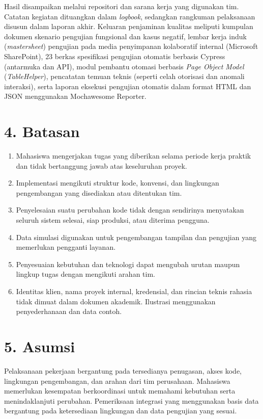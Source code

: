 Hasil disampaikan melalui repositori dan sarana kerja yang digunakan tim. Catatan kegiatan dituangkan dalam \textit{logbook}, sedangkan rangkuman pelaksanaan disusun dalam laporan akhir. Keluaran penjaminan kualitas meliputi kumpulan dokumen skenario pengujian fungsional dan kasus negatif, lembar kerja induk (\textit{mastersheet}) pengujian pada media penyimpanan kolaboratif internal (Microsoft SharePoint), 23 berkas spesifikasi pengujian otomatis berbasis Cypress (antarmuka dan API), modul pembantu otomasi berbasis \textit{Page Object Model} (\textit{TableHelper}), pencatatan temuan teknis (seperti celah otorisasi dan anomali interaksi), serta laporan eksekusi pengujian otomatis dalam format HTML dan JSON menggunakan Mochawesome Reporter.

\section*{4. Batasan}
\begin{enumerate}[label=\alph*)]
\item Mahasiswa mengerjakan tugas yang diberikan selama periode kerja praktik dan tidak bertanggung jawab atas keseluruhan proyek.
\item Implementasi mengikuti struktur kode, konvensi, dan lingkungan pengembangan yang disediakan atau ditentukan tim.
\item Penyelesaian suatu perubahan kode tidak dengan sendirinya menyatakan seluruh sistem selesai, siap produksi, atau diterima pengguna.
\item Data simulasi digunakan untuk pengembangan tampilan dan pengujian yang memerlukan pengganti layanan.
\item Penyesuaian kebutuhan dan teknologi dapat mengubah urutan maupun lingkup tugas dengan mengikuti arahan tim.
\item Identitas klien, nama proyek internal, kredensial, dan rincian teknis rahasia tidak dimuat dalam dokumen akademik. Ilustrasi menggunakan penyederhanaan dan data contoh.
\end{enumerate}

\section*{5. Asumsi}
Pelaksanaan pekerjaan bergantung pada tersedianya penugasan, akses kode, lingkungan pengembangan, dan arahan dari tim perusahaan. Mahasiswa memerlukan kesempatan berkoordinasi untuk memahami kebutuhan serta menindaklanjuti perubahan. Pemeriksaan integrasi yang menggunakan basis data bergantung pada ketersediaan lingkungan dan data pengujian yang sesuai.

